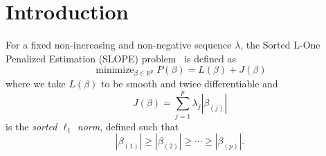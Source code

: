 \section{Introduction}\label{sec:introduction}

For a fixed non-increasing and non-negative sequence \(\lambda\), the 
Sorted L-One Penalized Estimation (SLOPE) problem~\cite{bogdan2013,bogdan2015} 
is defined as
\begin{equation}
  \label{eq:slope-problem}
  \operatorname{minimize}_{\beta \in \mathbb{R}^p}
  P(\beta) = L(\beta) + J(\beta)
\end{equation}
where we take \(L(\beta)\) to be smooth and twice differentiable and
\begin{equation}
  \label{eq:sortedl-l1-norm}
  J(\beta) = \sum_{j=1}^p \lambda_j|\beta_{(j)}|
\end{equation}
is the \emph{sorted \(\ell_1\) norm}, defined such that
\[
  |\beta_{(1)}| \geq |\beta_{(2)}| \geq \cdots \geq |\beta_{(p)}|.
\]
